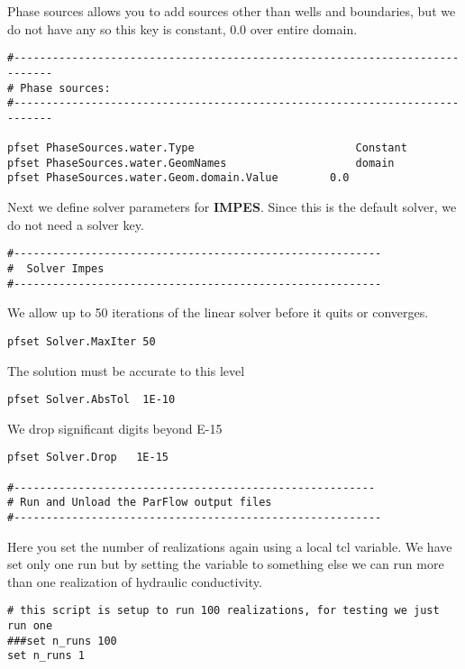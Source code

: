 Phase sources allows you to add sources other than wells and boundaries, but 
we do not have any so this key is constant, 0.0 over entire domain.

\begin{verbatim}
#----------------------------------------------------------------------------
# Phase sources:
#----------------------------------------------------------------------------

pfset PhaseSources.water.Type                         Constant
pfset PhaseSources.water.GeomNames                    domain
pfset PhaseSources.water.Geom.domain.Value        0.0
\end{verbatim}

Next we define solver parameters for {\bf IMPES}.  Since this is the default solver, we do not need a solver key.

\begin{verbatim}
#---------------------------------------------------------
#  Solver Impes  
#---------------------------------------------------------
\end{verbatim}

We allow up to 50 iterations of the linear solver before it quits or converges.

\begin{verbatim}
pfset Solver.MaxIter 50
\end{verbatim}

The solution must be accurate to this level 

\begin{verbatim}
pfset Solver.AbsTol  1E-10
\end{verbatim}

We drop significant digits beyond E-15

\begin{verbatim}
pfset Solver.Drop   1E-15

#--------------------------------------------------------
# Run and Unload the ParFlow output files
#---------------------------------------------------------
\end{verbatim}

Here you set the number of realizations again using a local tcl variable.  
We have set only one run but by setting the  variable to something 
else we can run more than one realization of hydraulic conductivity. 

\begin{verbatim}
# this script is setup to run 100 realizations, for testing we just run one
###set n_runs 100
set n_runs 1
\end{verbatim}

